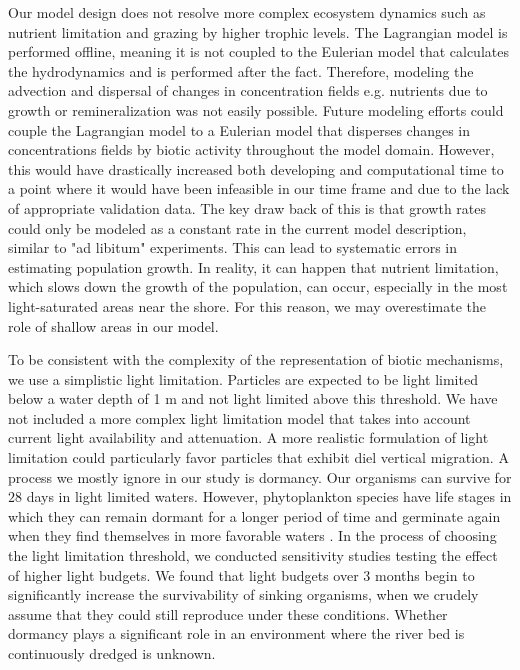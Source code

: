 \documentclass[npg, manuscript]{copernicus}
\begin{document}
Our model design does not resolve more complex ecosystem dynamics such as nutrient limitation and grazing by higher trophic levels. 
The Lagrangian model is performed offline, meaning it is not coupled to the Eulerian model that calculates the hydrodynamics and is performed after the fact.
Therefore, modeling the advection and dispersal of changes in concentration fields e.g. nutrients due to growth or remineralization was not easily possible.
Future modeling efforts could couple the Lagrangian model to a Eulerian model that disperses changes in concentrations fields by biotic activity throughout the model domain.
However, this would have drastically increased both developing and computational time to a point where it would have been infeasible in our time frame and due to the lack of appropriate validation data.
The key draw back of this is that growth rates could only be modeled as a constant rate in the current model description, similar to "ad libitum" experiments. 
This can lead to systematic errors in estimating population growth.
In reality, it can happen that nutrient limitation, which slows down the growth of the population, can occur, especially in the most light-saturated areas near the shore. For this reason, we may overestimate the role of shallow areas in our model.


To be consistent with the complexity of the representation of biotic mechanisms, we use a simplistic light limitation.
Particles are expected to be light limited below a water depth of 1 \unit{m} and not light limited above this threshold. 
We have not included a more complex light limitation model that takes into account current light availability and attenuation.
A more realistic formulation of light limitation could particularly favor particles that exhibit diel vertical migration.
A process we mostly ignore in our study is dormancy.
Our organisms can survive for $28$ days in light limited waters.
However, phytoplankton species have life stages in which they can remain dormant for a longer period of time and germinate again when they find themselves in more favorable waters \citep{ThomasAnderson1998}.
In the process of choosing the light limitation threshold, we conducted sensitivity studies testing the effect of higher light budgets.
We found that light budgets over 3 months begin to significantly increase the survivability of sinking organisms, when we crudely assume that they could still reproduce under these conditions.
Whether dormancy plays a significant role in an environment where the river bed is continuously dredged is unknown.
\end{document}
